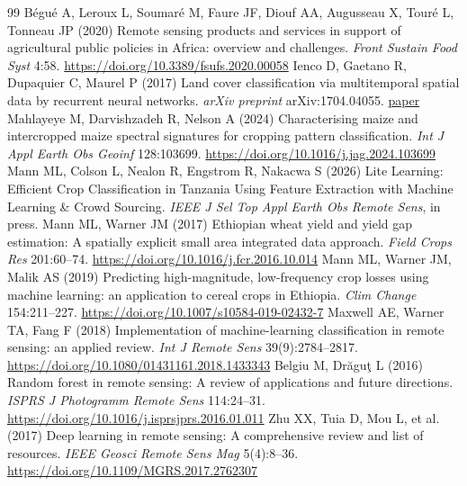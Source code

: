 \documentclass[journal]{IEEEtran}
\begin{document}
\begin{thebibliography}{99}
Bégué A, Leroux L, Soumaré M, Faure JF, Diouf AA, Augusseau X, Touré L, Tonneau JP (2020) Remote sensing products and services in support of agricultural public policies in Africa: overview and challenges. \textit{Front Sustain Food Syst} 4:58. \href{https://doi.org/10.3389/fsufs.2020.00058}{https://doi.org/10.3389/fsufs.2020.00058}
Ienco D, Gaetano R, Dupaquier C, Maurel P (2017) Land cover classification via 
multitemporal spatial data by recurrent neural networks. \textit{arXiv preprint} 
arXiv:1704.04055. \href{https://arxiv.org/abs/1704.04055}{paper}
Mahlayeye M, Darvishzadeh R, Nelson A (2024) Characterising maize and intercropped maize spectral signatures for cropping pattern classification. \textit{Int J Appl Earth Obs Geoinf} 128:103699. \href{https://doi.org/10.1016/j.jag.2024.103699}{https://doi.org/10.1016/j.jag.2024.103699}
Mann ML, Colson L, Nealon R, Engstrom R, Nakacwa S (2026) Lite Learning: Efficient Crop Classification in Tanzania Using Feature Extraction with Machine Learning \& Crowd Sourcing. \textit{IEEE J Sel Top Appl Earth Obs Remote Sens}, in press.
Mann ML, Warner JM (2017) Ethiopian wheat yield and yield gap estimation: A spatially explicit small area integrated data approach. \textit{Field Crops Res} 201:60--74. \href{https://doi.org/10.1016/j.fcr.2016.10.014}{https://doi.org/10.1016/j.fcr.2016.10.014}
Mann ML, Warner JM, Malik AS (2019) Predicting high-magnitude, low-frequency crop losses using machine learning: an application to cereal crops in Ethiopia. \textit{Clim Change} 154:211--227. \href{https://doi.org/10.1007/s10584-019-02432-7}{https://doi.org/10.1007/s10584-019-02432-7}
Maxwell AE, Warner TA, Fang F (2018) Implementation of machine-learning classification in remote sensing: an applied review. \textit{Int J Remote Sens} 39(9):2784--2817. \href{https://doi.org/10.1080/01431161.2018.1433343}{https://doi.org/10.1080/01431161.2018.1433343}
Belgiu M, Dr\u{a}gu\c{t} L (2016) Random forest in remote sensing: A review of applications and future directions. \textit{ISPRS J Photogramm Remote Sens} 114:24--31. \href{https://doi.org/10.1016/j.isprsjprs.2016.01.011}{https://doi.org/10.1016/j.isprsjprs.2016.01.011}
Zhu XX, Tuia D, Mou L, et al. (2017) Deep learning in remote sensing: A comprehensive review and list of resources. \textit{IEEE Geosci Remote Sens Mag} 5(4):8--36. \href{https://doi.org/10.1109/MGRS.2017.2762307}{https://doi.org/10.1109/MGRS.2017.2762307}

\end{thebibliography}
\end{document}
